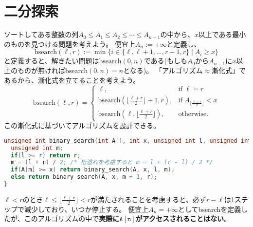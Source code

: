 \documentclass[a4paper,twoside,onecolumn,openany,article,10pt]{memoir}
\theoremstyle{remark}
\begin{document}
\section{二分探索}
ソートしてある整数の列$A_0\le A_1\le A_2\le \dotsb\le A_{n-1}$の中から、$x$以上である最小のものを見つける問題を考えよう。
便宜上$A_n := +\infty$と定義し、
\begin{equation*}
\mathrm{bsearch}(\ell, r) := \min\bigl\{i\in\{\ell,\ell+1,\dotsc,r-1,r\}\mid A_i\ge x\bigr\}
\end{equation*}
と定義すると、解きたい問題は$\mathrm{bsearch}(0,n)$である(もしも$A_0$から$A_{n-1}$に$x$以上のものが無ければ$\mathrm{bsearch}(0,n)=n$となる)。
「アルゴリズム$\approx$漸化式」であるから、漸化式を立てることを考えよう。
\begin{equation*}
\mathrm{bsearch}(\ell, r) =
\begin{cases}
\ell,& \text{if } \ell = r\\
\mathrm{bsearch}(\lfloor \frac{\ell + r}2\rfloor+1, r),& \text{if } A_{\lfloor\frac{\ell + r}2\rfloor} < x\\
\mathrm{bsearch}(\ell, \lfloor \frac{\ell + r}2\rfloor),& \text{otherwise.}
\end{cases}
\end{equation*}
この漸化式に基づいてアルゴリズムを設計できる。

\begin{lstlisting}[basicstyle=\ttfamily\normalsize,showstringspaces=false,language=C,frame=single]
unsigned int binary_search(int A[], int x, unsigned int l, unsigned int r){
  unsigned int m;
  if(l >= r) return r;
  m = (l + r) / 2; /* 桁溢れを考慮すると m = l + (r - l) / 2 */
  if(A[m] >= x) return binary_search(A, x, l, m);
  else return binary_search(A, x, m + 1, r);
}
\end{lstlisting}
$\ell<r$のとき$\ell \le \lfloor \frac{\ell+r}2\rfloor < r$が満たされることを考慮すると、必ず$r-\ell$は1ステップで減少しており、いつか停止する。
便宜上$A_n=+\infty$として\textrm{bsearch}を定義したが、このアルゴリズムの中で\textbf{実際に$\mathtt{A[n]}$がアクセスされることはない}。
\end{document}
